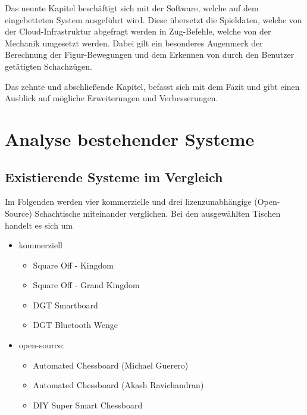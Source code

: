 Das neunte Kapitel beschäftigt sich mit der Software, welche auf dem
eingebetteten System ausgeführt wird. Diese übersetzt die Spieldaten,
welche von der Cloud-Infrastruktur abgefragt werden in Zug-Befehle,
welche von der Mechanik umgesetzt werden. Dabei gilt ein besonderes
Augenmerk der Berechnung der Figur-Bewegungen und dem Erkennen von durch
den Benutzer getätigten Schachzügen.

Das zehnte und abschließende Kapitel, befasst sich mit dem Fazit und
gibt einen Ausblick auf mögliche Erweiterungen und Verbesserungen.

\hypertarget{analyse-bestehender-systeme}{%
\chapter{Analyse bestehender
Systeme}\label{analyse-bestehender-systeme}}

\hypertarget{existierende-systeme-im-vergleich}{%
\section{Existierende Systeme im
Vergleich}\label{existierende-systeme-im-vergleich}}

Im Folgenden werden vier kommerzielle und drei lizenzunabhängige
(Open-Source) Schachtische miteinander verglichen. Bei den ausgewählten
Tischen handelt es sich um

\begin{itemize}
\tightlist
\item
  kommerziell

  \begin{itemize}
  \tightlist
  \item
    Square Off - Kingdom
  \item
    Square Off - Grand Kingdom
  \item
    DGT Smartboard
  \item
    DGT Bluetooth Wenge
  \end{itemize}
\item
  open-source:

  \begin{itemize}
  \tightlist
  \item
    Automated Chessboard (Michael Guerero)
  \item
    Automated Chessboard (Akash Ravichandran)
  \item
    DIY Super Smart Chessboard
  \end{itemize}
\end{itemize}

